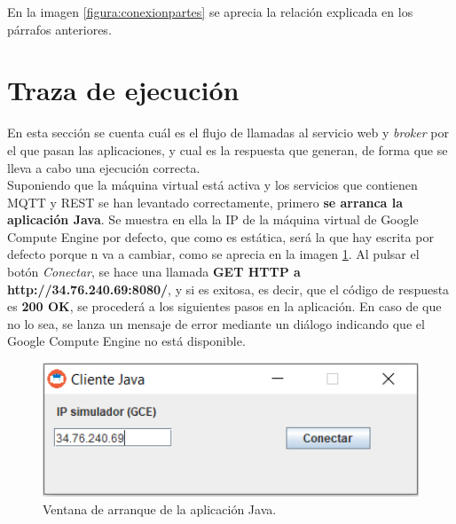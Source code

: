 \documentclass[12pt,spanish,listoffigures,listoftables]{tfgetsinf}
\begin{document}
En la imagen \ref{figura:conexionpartes} se aprecia la relación explicada en los párrafos anteriores.

\section{Traza de ejecución}

En esta sección se cuenta cuál es el flujo de llamadas al servicio web y \textit{broker} por el que pasan las aplicaciones, y cual es la respuesta que generan, de forma que se lleva a cabo una ejecución correcta. \\

Suponiendo que la máquina virtual está activa y los servicios que contienen MQTT y REST se han levantado correctamente, primero \textbf{se arranca la aplicación Java}. Se muestra en ella la IP de la máquina virtual de Google Compute Engine por defecto, que como es estática, será la que hay escrita por defecto porque n va a cambiar, como se aprecia en la imagen \ref{figura:mainwindow}. Al pulsar el botón \textit{Conectar}, se hace una llamada \textbf{GET HTTP a http://34.76.240.69:8080/}, y si es exitosa, es decir, que el código de respuesta es \textbf{200 OK}, se procederá a los siguientes pasos en la aplicación. En caso de que no lo sea, se lanza un mensaje de error mediante un diálogo indicando que el Google Compute Engine no está disponible.

\begin{figure}[!h]
	\centering
	\includegraphics[height=4cm]{img/mainwindow}
	\caption{Ventana de arranque de la aplicación Java.}
	\label{figura:mainwindow}
\end{figure}
\end{document}
